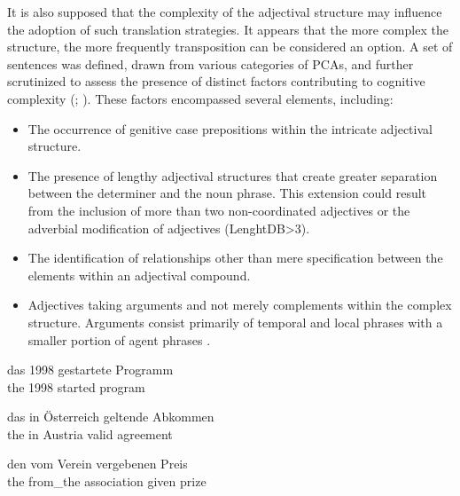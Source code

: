 \documentclass[output=paper,colorlinks,citecolor=brown]{langscibook}
\begin{document}
It is also supposed that the complexity of the adjectival structure may influence the adoption of such translation strategies. It appears that the more complex the structure, the more frequently transposition can be considered an option. A set of sentences was defined, drawn from various categories of PCAs, and further scrutinized to assess the presence of distinct factors contributing to cognitive complexity (\citealt{Rohdenburg1996}; \citealt{GriesWulff2011}). These factors encompassed several elements, including:

\begin{itemize}
\item  The occurrence of genitive case prepositions within the intricate adjectival structure.
\end{itemize}

\begin{itemize}
\item The presence of lengthy adjectival structures that create greater separation between the determiner and the noun phrase. This extension could result from the inclusion of more than two non-coordinated adjectives or the adverbial modification of adjectives (LenghtDB>3).
\item The identification of relationships other than mere specification between the elements within an adjectival compound.
\item Adjectives taking arguments and not merely complements within the complex structure. Arguments consist primarily of temporal  and local phrases  with a smaller portion of agent phrases .
\end{itemize}

\ea%
    \label{ex:resi:62}
\gll das  1998  gestartete  Programm \\
   the   1998  started  program  \\
\z



\ea%
    \label{ex:resi:63}
\gll das  in  Österreich  geltende  Abkommen \\
    the  in  Austria  valid  agreement \\
\z



\ea%
    \label{ex:resi:64}
\gll den  vom  Verein  vergebenen  Preis \\
    the  from\_the  association  given  prize \\
\z
\end{document}
